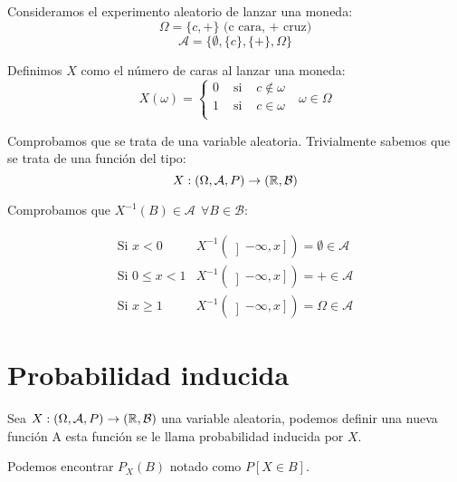 \begin{ejemplo}
    Consideramos el experimento aleatorio de lanzar una moneda:
    $$\Omega = \{c, +\} \mbox{ (c cara, + cruz)}$$
    $$\mathcal{A} = \{\emptyset, \{c\}, \{+\}, \Omega \}$$
    
    Definimos $X$ como el número de caras al lanzar una moneda:
    $$X(\omega) = \left\{ \begin{array}{lcl}
        0 & \mbox{ si } & c \notin \omega \\
        1 & \mbox{ si } & c \in \omega    \\
      \end{array} \right.~~~\omega \in \Omega$$

    Comprobamos que se trata de una variable aleatoria. Trivialmente sabemos que se trata de una función del tipo:
    $$X : (\Omega, \mathcal{A}, P) \rightarrow (\mathbb R, \mathcal{B})$$
    
    Comprobamos que $X^{-1}(B) \in \mathcal{A}~~\forall B \in \mathcal{B}$:
    
    $$\begin{array}{ll}
        \mbox{Si } x<0       & X^{-1}(\left] -\infty, x \right] ) = \emptyset \in \mathcal{A} \\
        \mbox{Si } 0\leq x<1 & X^{-1}(\left] -\infty, x \right] ) = + \in \mathcal{A}         \\
        \mbox{Si } x\geq 1   & X^{-1}(\left] -\infty, x \right] ) = \Omega \in \mathcal{A}
      \end{array}$$
\end{ejemplo}

\section{Probabilidad inducida}
\begin{definicion}
    Sea $X:(\Omega, \mathcal{A}, P) \rightarrow (\mathbb R, \mathcal{B})$ una variable aleatoria, podemos definir una nueva función
    A esta función se le llama probabilidad inducida por $X$.
\end{definicion}
\begin{notacion}
    Podemos encontrar $P_X(B)$ notado como $P[X \in B]$.
\end{notacion}

